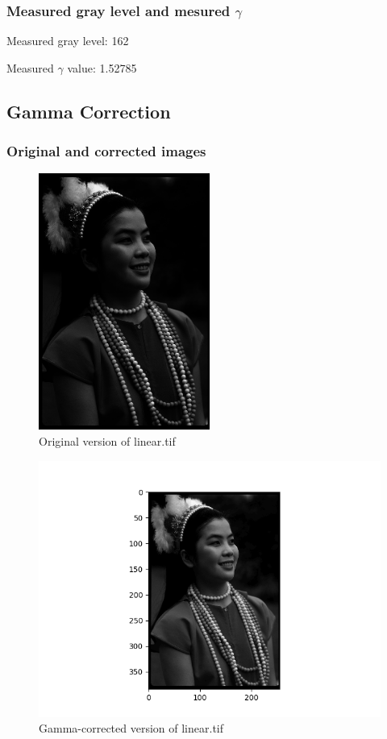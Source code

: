 \documentclass{article}
\begin{document}
\subsubsection{Measured gray level and mesured $\gamma$}
\begin{center}
    Measured gray level: 162

    Measured $\gamma$ value: 1.52785
\end{center}

\subsection{Gamma Correction}
\subsubsection{Original and corrected images}
\begin{figure}[H]
    \centering
    \includegraphics[width=0.5\textwidth]{../linear.png}
    \caption{Original version of linear.tif}
\end{figure}
\begin{figure}[H]
    \centering
    \includegraphics[width=1\textwidth]{../linear-gamma-corrected.png}
    \caption{Gamma-corrected version of linear.tif}
\end{figure}
\end{document}
